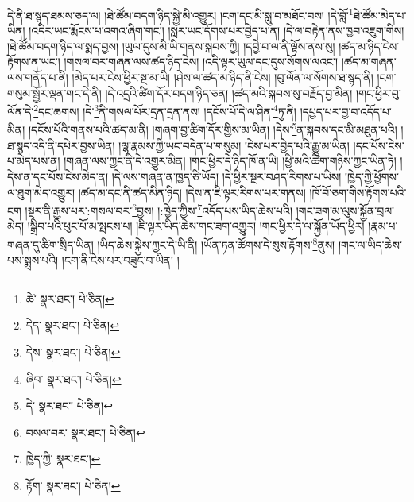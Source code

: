 དེ་ནི་ཐ་སྙད་ཐམས་ཅད་ལ། །ཐེ་ཚོམ་བདག་ཉིད་སྐྱེ་མི་འགྱུར། །ངག་དང་མི་སླུ་བ་མཐོང་བས། །དེ་བློ་\footnote{ཚེ་  སྣར་ཐང་།  པེ་ཅིན། }ཐེ་ཚོམ་མེད་པ་ཡིན། །འདིར་ཡང་རྨོངས་པ་འགའ་ཞིག་གང་། །སླར་ཡང་དོགས་པར་བྱེད་པ་ན། །དེ་ལ་བརྟེན་ནས་ཁྱབ་འཇུག་གིས། །ཐེ་ཚོམ་བདག་ཉིད་ལ་སྨད་བྱས། །ཡུལ་དུས་མི་ཡི་གནས་སྐབས་ཀྱི། །དབྱེ་བ་ལ་ནི་ལྟོས་ནས་སུ། །ཚད་མ་ཉིད་ངེས་རྟོགས་ན་ཡང་། །གསལ་བར་གཞན་ལས་ཚད་ཉིད་ངེས། །འདི་ལྟར་ཡུལ་དང་དུས་སོགས་ལའང་། །ཚད་མ་གཞན་ལས་གནོད་པ་ནི། །མེད་པར་ངེས་ཕྱིར་སྔ་མ་ཡི། །ཤེས་ལ་ཚད་མ་ཉིད་ནི་ངེས། །བུ་ལོན་ལ་སོགས་ཐ་སྙད་ནི། །ངག་གསུམ་སྦྱོར་ལྡན་གང་དེ་ནི། །དེ་འདྲའི་ཚིག་དོར་བདག་ཉིད་ཅན། །ཚད་མའི་སྐབས་སུ་བརྗོད་བྱ་མིན། །གང་ཕྱིར་བུ་ལོན་དེ་\footnote{དེད་  སྣར་ཐང་།  པེ་ཅིན། }དང་ཆགས། །དེ་\footnote{དེས་  སྣར་ཐང་།  པེ་ཅིན། }ནི་གསལ་པོར་དྲན་དྲན་ནས། །དངོས་པོ་དེ་ལ་ཤིན་\footnote{ཞིབ་  སྣར་ཐང་།  པེ་ཅིན། }ཏུ་ནི། །དཔྱད་པར་བྱ་བ་འདོད་པ་མིན། །དངོས་པོའི་གནས་པའི་ཚད་མ་ནི། །གཞག་བྱ་ཚིག་དོར་གྱིས་མ་ཡིན། །དེས་\footnote{དེ་  སྣར་ཐང་།  པེ་ཅིན། }ན་སྐབས་དང་མི་མཐུན་པའི། །ཐ་སྙད་འདི་ནི་དཔེར་བྱས་ཡིན། །ལྷ་རྣམས་ཀྱི་ཡང་བདེན་པ་གསུམ། །ངེས་པར་བྱེད་པའི་རྒྱུ་མ་ཡིན། །དང་པོས་ངེས་པ་མེད་པས་ན། །གཞན་ལས་ཀྱང་ནི་དེ་འགྱུར་མིན། །གང་ཕྱིར་དེ་ཉིད་ཁོ་ན་ཡི། །ཕྱི་མའི་ཚིག་གཉིས་ཀྱང་ཡིན་ཏེ། །དེས་ན་དང་པོས་ངེས་མེད་ན། །དེ་ལས་གཞན་ན་ཁྱད་ཅི་ཡོད། །དེ་ཕྱིར་སྔར་བཤད་རིགས་པ་ཡིས། །ཁྱེད་ཀྱི་ཕྱོགས་ལ་ཐུག་མེད་འགྱུར། །ཚད་མ་དང་ནི་ཚད་མིན་ཉིད། །དེས་ན་ཇི་ལྟར་རིགས་པར་གནས། །ཁོ་བོ་ཅག་གིས་རྟོགས་པའི་ངག །སྔར་ནི་རྒྱས་པར་:གསལ་བར་\footnote{བསལ་བར་  སྣར་ཐང་།  པེ་ཅིན། }བྱས། །:ཁྱེད་ཀྱིས་\footnote{ཁྱེད་ཀྱི་  སྣར་ཐང་། }འདོད་པས་ཡིད་ཆེས་པའི། །གང་ཟག་མ་ལུས་སྐྱོན་བྲལ་མེད། །སྒྲིབ་པའི་ཕུང་པོ་མ་སྤངས་པ། །ཇི་ལྟར་ཡིད་ཆེས་གང་ཟག་འགྱུར། །གང་ཕྱིར་དེ་ལ་སྐྱོན་ཡོད་ཕྱིར། །རྣམ་པ་གཞན་དུ་ཚིག་སྲིད་ཡིན། །ཡིད་ཆེས་སྐྱེས་ཀྱང་དེ་ཡི་ནི། །ཡོན་ཏན་ཚོགས་དེ་སུས་རྟོགས་\footnote{རྟོག་  སྣར་ཐང་།  པེ་ཅིན། }ནུས། །གང་ལ་ཡིད་ཆེས་པས་སྨྲས་པའི། །ངག་ནི་ངེས་པར་བཟུང་བ་ཡིན། །
